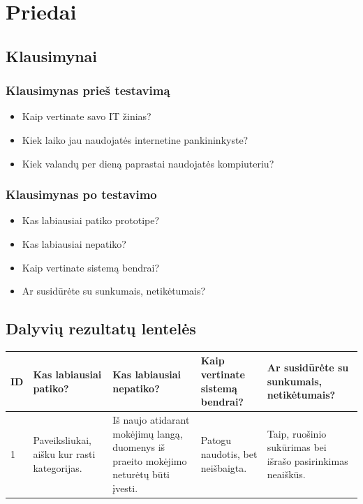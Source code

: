 \documentclass[oneside]{VUMIFPSkursinis}
\begin{document}
\section{Priedai}
\subsection{Klausimynai}
\subsubsection{Klausimynas prieš testavimą}
\begin{itemize}
	\item Kaip vertinate savo IT žinias?
	\item Kiek laiko jau naudojatės internetine pankininkyste?
	\item Kiek valandų per dieną paprastai naudojatės kompiuteriu?
\end{itemize}
\subsubsection{Klausimynas po testavimo}
	\begin{itemize}
			\item Kas labiausiai patiko prototipe?
			\item Kas labiausiai nepatiko?
			\item Kaip vertinate sistemą bendrai?
			\item Ar susidūrėte su sunkumais, netikėtumais?
	\end{itemize}
\subsection{Dalyvių rezultatų lentelės}
\begin{center}
	\begin{tabular}{ |p{1cm} | p{3cm} | p{4cm} | p{4cm} | p{3cm} |}
	\hline
ID&Kas labiausiai patiko?&Kas labiausiai nepatiko?&Kaip vertinate sistemą bendrai?&Ar susidūrėte su sunkumais, netikėtumais?\\ \hline
1&Paveiksliukai, aišku kur rasti kategorijas.&Iš naujo atidarant mokėjimų langą, duomenys iš praeito mokėjimo neturėtų būti įvesti.&Patogu naudotis, bet neišbaigta.&Taip, ruošinio sukūrimas bei išrašo pasirinkimas neaiškūs. \\ \hline

	\end{tabular}
\end{center}
\end{document}
